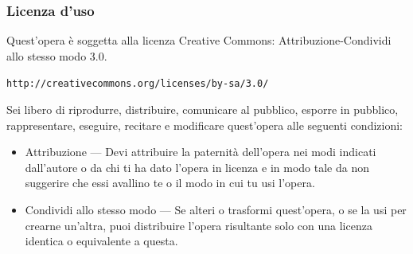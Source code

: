 



\begin{frame}[containsverbatim]\frametitle{Licenza d'uso}
  \small

  Quest'opera {\`e} soggetta alla licenza Creative Commons: Attribuzione-Condividi
  allo stesso modo 3.0.

  \verb+http://creativecommons.org/licenses/by-sa/3.0/+

  Sei libero di riprodurre, distribuire, comunicare al pubblico, esporre in
  pubblico, rappresentare, eseguire, recitare e modificare quest'opera
  alle seguenti condizioni:
  \begin{itemize}
  \item
    Attribuzione — Devi attribuire la paternit{\`a} dell'opera nei modi indicati
    dall'autore o da chi ti ha dato l'opera in licenza e in modo tale da non
    suggerire che essi avallino te o il modo in cui tu usi l'opera.
  \item
    Condividi allo stesso modo — Se alteri o trasformi quest'opera, o se la usi
    per crearne un'altra, puoi distribuire l'opera risultante solo con una licenza
    identica o equivalente a  questa.
  \end{itemize}
  \vspace*{1cm}
\end{frame}



